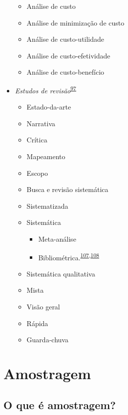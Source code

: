 \documentclass[
]{book}
\begin{document}
\begin{itemize}
  \begin{itemize}
  \item
    Análise de custo
  \item
    Análise de minimização de custo
  \item
    Análise de custo-utilidade
  \item
    Análise de custo-efetividade
  \item
    Análise de custo-benefício
  \end{itemize}
\item
  \emph{Estudos de revisão}\textsuperscript{\protect\hyperlink{ref-Grant2009}{97}}

  \begin{itemize}
  \item
    Estado-da-arte
  \item
    Narrativa
  \item
    Crítica
  \item
    Mapeamento
  \item
    Escopo
  \item
    Busca e revisão sistemática
  \item
    Sistematizada
  \item
    Sistemática

    \begin{itemize}
    \item
      Meta-análise
    \item
      Bibliométrica.\textsuperscript{\protect\hyperlink{ref-donthu2021}{107},\protect\hyperlink{ref-lim2023}{108}}
    \end{itemize}
  \item
    Sistemática qualitativa
  \item
    Mista
  \item
    Visão geral
  \item
    Rápida
  \item
    Guarda-chuva
  \end{itemize}
\end{itemize}

\hypertarget{amostragem}{%
\section{Amostragem}\label{amostragem}}

\hypertarget{o-que-uxe9-amostragem}{%
\subsection{O que é amostragem?}\label{o-que-uxe9-amostragem}}
\end{document}
